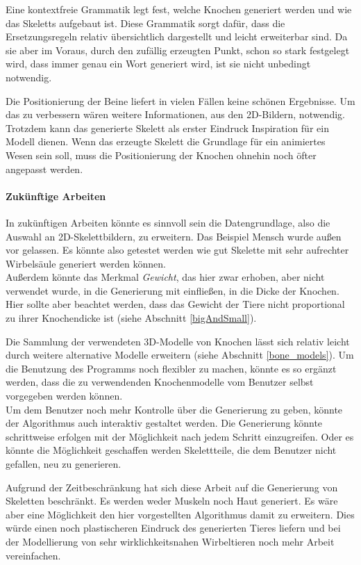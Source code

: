 Eine kontextfreie Grammatik legt fest, welche Knochen generiert werden und wie das Skeletts aufgebaut ist.
Diese Grammatik sorgt dafür, dass die Ersetzungsregeln relativ übersichtlich dargestellt und leicht erweiterbar sind. Da sie aber im Voraus, durch den zufällig erzeugten Punkt, schon so stark festgelegt wird, dass immer genau ein Wort generiert wird, ist sie nicht unbedingt notwendig.

Die Positionierung der Beine liefert in vielen Fällen keine schönen Ergebnisse. Um das zu verbessern wären weitere Informationen, \zb aus den 2D-Bildern, notwendig. Trotzdem kann das generierte Skelett als erster Eindruck \bzw Inspiration für ein Modell dienen. Wenn das erzeugte Skelett die Grundlage für ein animiertes Wesen sein soll, muss die Positionierung der Knochen ohnehin noch öfter angepasst werden.


\paragraph{Zukünftige Arbeiten}

In zukünftigen Arbeiten könnte es sinnvoll sein die Datengrundlage, also die Auswahl an 2D-Skelettbildern, zu erweitern. Das Beispiel Mensch wurde \zb außen vor gelassen. Es könnte also getestet werden wie gut Skelette mit sehr aufrechter Wirbelsäule generiert werden können.\\
Außerdem könnte das Merkmal \emph{Gewicht}, das hier zwar erhoben, aber nicht verwendet wurde, in die Generierung mit einfließen, \zb in die Dicke der Knochen. Hier sollte aber beachtet werden, dass das Gewicht der Tiere nicht proportional zu ihrer Knochendicke ist (siehe Abschnitt \ref{bigAndSmall}).

Die Sammlung der verwendeten 3D-Modelle von Knochen lässt sich relativ leicht durch weitere \bzw alternative Modelle erweitern (siehe Abschnitt \ref{bone_models}). Um die Benutzung des Programms noch flexibler zu machen, könnte es so ergänzt werden, dass die zu verwendenden Knochenmodelle vom Benutzer selbst vorgegeben werden können.\\
Um dem Benutzer noch mehr Kontrolle über die Generierung zu geben, könnte der Algorithmus auch interaktiv gestaltet werden. Die Generierung könnte \zb schrittweise erfolgen mit der Möglichkeit nach jedem Schritt einzugreifen. Oder es könnte die Möglichkeit geschaffen werden Skelettteile, die dem Benutzer nicht gefallen, neu zu generieren.

Aufgrund der Zeitbeschränkung hat sich diese Arbeit auf die Generierung von Skeletten beschränkt. Es werden weder Muskeln noch Haut generiert. Es wäre aber eine Möglichkeit den hier vorgestellten Algorithmus damit zu erweitern. Dies würde einen noch plastischeren Eindruck des generierten Tieres liefern und bei der Modellierung von sehr wirklichkeitsnahen Wirbeltieren noch mehr Arbeit vereinfachen.


